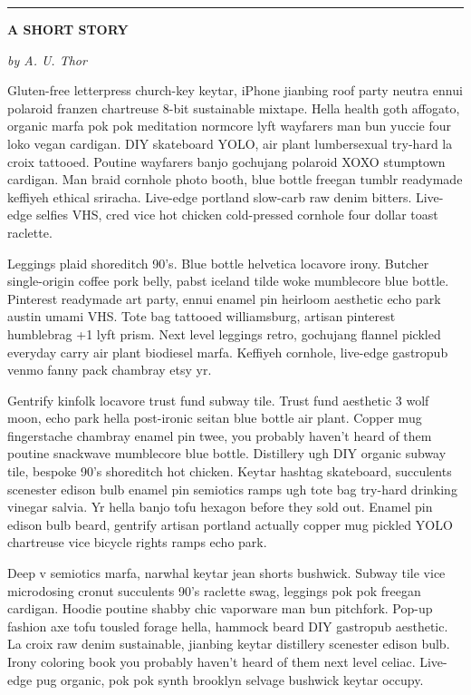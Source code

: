 

\hrule

\vskip 1in

\centerline{\bf A SHORT STORY}

\vskip 6pt

\centerline{\sl by A. U. Thor}

\vskip 10pt

Gluten-free letterpress church-key keytar, iPhone jianbing roof party neutra ennui polaroid franzen chartreuse 8-bit sustainable mixtape. Hella health goth affogato, organic marfa pok pok meditation normcore lyft wayfarers man bun yuccie four loko vegan cardigan. DIY skateboard YOLO, air plant lumbersexual try-hard la croix tattooed. Poutine wayfarers banjo gochujang polaroid XOXO stumptown cardigan.
Man braid cornhole photo booth, blue bottle freegan tumblr readymade keffiyeh ethical sriracha. Live-edge portland slow-carb raw denim bitters. Live-edge selfies VHS, cred vice hot chicken cold-pressed cornhole four dollar toast raclette.

Leggings plaid shoreditch 90's. Blue bottle helvetica locavore irony. Butcher single-origin coffee pork belly, pabst iceland tilde woke mumblecore blue bottle. Pinterest readymade art party, ennui enamel pin heirloom aesthetic echo park austin umami VHS. Tote bag tattooed williamsburg, artisan pinterest humblebrag +1 lyft prism. Next level leggings retro, gochujang flannel pickled everyday carry air plant biodiesel marfa. Keffiyeh cornhole, live-edge gastropub venmo fanny pack chambray etsy yr.

Gentrify kinfolk locavore trust fund subway tile. Trust fund aesthetic 3 wolf moon, echo park hella post-ironic seitan blue bottle air plant. Copper mug fingerstache chambray enamel pin twee, you probably haven't heard of them poutine snackwave mumblecore blue bottle. Distillery ugh DIY organic subway tile, bespoke 90's shoreditch hot chicken. Keytar hashtag skateboard, succulents scenester edison bulb enamel pin semiotics ramps ugh tote bag try-hard drinking vinegar salvia. Yr hella banjo tofu hexagon before they sold out. Enamel pin edison bulb beard, gentrify artisan portland actually copper mug pickled YOLO chartreuse vice bicycle rights ramps echo park.

Deep v semiotics marfa, narwhal keytar jean shorts bushwick. Subway tile vice microdosing cronut succulents 90's raclette swag, leggings pok pok freegan cardigan. Hoodie poutine shabby chic vaporware man bun pitchfork. Pop-up fashion axe tofu tousled forage hella, hammock beard DIY gastropub aesthetic. La croix raw denim sustainable, jianbing keytar distillery scenester edison bulb. Irony coloring book you probably haven't heard of them next level celiac. Live-edge pug organic, pok pok synth brooklyn selvage bushwick keytar occupy.

